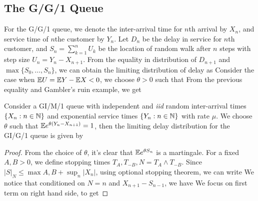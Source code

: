 \documentclass[a4paper,10pt,english]{article}
\begin{document}
\subsection{The G/G/1 Queue}
For the G/G/1 queue, we denote the inter-arrival time for $n$th arrival by $X_n$, and service time of $n$the customer by $Y_n$. 
Let $D_n$ be the delay in service for $n$th customer, and $S_n = \sum_{k=1}^{n}U_k$ be the location of random walk after $n$ steps with step size $U_n = Y_n - X_{n+1}$. 
From the equality in distribution of $D_{n+1}$ and $\max\{S_0, \dots, S_n\}$, we can obtain the limiting distribution of delay as 
Consider the case when $\mathbb{E} U = \mathbb{E} Y  - \mathbb{E} X < 0$, we choose $\theta > 0$ such that
From the previous equality and Gambler's ruin example, we get 
\begin{prop} 
Consider a GI/M/1 queue with independent and \textit{iid} random inter-arrival times $\{X_n: n \in \mathbb{N}\}$ and exponential service times $\{Y_n: n \in \mathbb{N}\}$ with rate $\mu$.  
We choose $\theta$ such that $\mathbb{E} e^{\theta (Y_n - X_{n+1})} = 1$, then the limiting delay distribution for the GI/G/1 queue is given by 
\end{prop}
\begin{proof} 
From the choice of $\theta$, it's clear that $\mathbb{E} e^{\theta S_n}$ is a martingale. 
For a fixed $A, B > 0$, we define stopping times $T_A, T_{-B}, N = T_{A}\wedge T_{-B}$. 
Since $|S|_{N} \leq \max{A,B}+ \sup_{n}|X_n|$, using optional stopping theorem, we can write 
\eq{
1 &= \E[e^{\theta S_N}|S_N\geq A]\Pr\{T_A < T_{-B}] + \E[e^{\theta S_N}|S_N\leq -B]\Pr\{T_A > T_{-B}\}.
}
We notice that conditioned on $N = n$ and $X_{n+1}- S_{n-1}$, we have 
We focus on first term on right hand side, to get 

\end{proof} 
\end{document}
